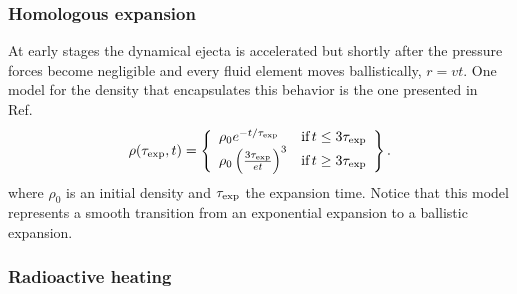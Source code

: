\subsubsection{Homologous expansion}
 
At early stages the dynamical ejecta is accelerated but shortly after the pressure forces become negligible and every fluid element moves ballistically, $r=vt$. One model for the density that encapsulates this behavior is the one presented in Ref.~\cite{lippuner_r-process_2015}
\begin{equation}\label{eq:homol}
  \rho(\tau_{\rm exp},t)=
  \left \{
    \begin{array}{lr}
      \rho_0e^{-t/\tau_{\rm exp}} & \text{if}\, t\leq 3\tau_{\rm exp} \\
      \rho_0 \left (\frac{3\tau_{\rm exp}}{et}\right )^3& \text{if}\, t \geq 3\tau_{\rm exp} \\
    \end{array}
  \right \}.
\end{equation}
where $\rho_0$ is an initial density and $\tau_{\rm exp}$ the expansion time. 
Notice that this model represents a smooth transition from an exponential expansion to a ballistic expansion. 


\subsubsection{Radioactive heating}

